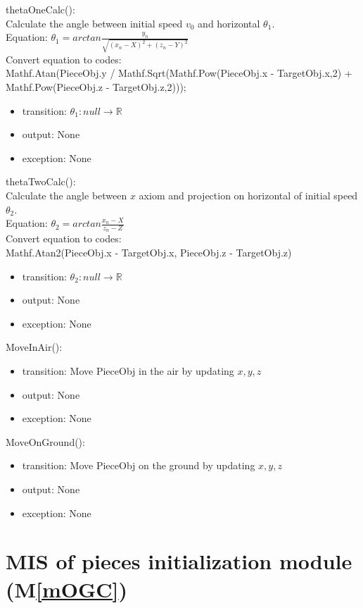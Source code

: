 \documentclass[12pt, titlepage]{article}
\newcommand{\mref}[1]{M\ref{#1}}
\begin{document}
\noindent thetaOneCalc():\\
Calculate the angle between initial speed $v_{0}$ and horizontal $\theta_{1}$. \\
Equation: $\theta_{1}=arctan \frac{y_{n}}{\sqrt{(x_{n}-X)^2+(z_{n}-Y)^2}}$\\
Convert equation to codes:\\
Mathf.Atan(PieceObj.y / Mathf.Sqrt(Mathf.Pow(PieceObj.x - TargetObj.x,2) + Mathf.Pow(PieceObj.z - TargetObj.z,2)));
\begin{itemize}
	\item transition: $\theta_{1}: null \to \mathbb{R}$   
	\item output: None
	\item exception: None
\end{itemize}

\noindent thetaTwoCalc():\\
Calculate the angle between $x$ axiom and projection on horizontal of initial speed $\theta_{2}$.\\
Equation: $\theta_{2}=arctan \frac{x_{n}-X}{z_{n}-Z}$\\
Convert equation to codes:\\
Mathf.Atan2(PieceObj.x - TargetObj.x, PieceObj.z - TargetObj.z)
\begin{itemize}
	\item transition: $\theta_{2}: null \to \mathbb{R}$  
	\item output: None
	\item exception: None
\end{itemize}

\noindent MoveInAir(): \an{use \mref{mDC1} here}
\begin{itemize}
	\item transition: Move PieceObj in the air by updating $x,y,z$
	\item output: None
	\item exception: None
\end{itemize}

\noindent MoveOnGround(): \an{use \mref{mDC1} here}
\begin{itemize}
	\item transition: Move PieceObj on the ground by updating $x,y,z$
	\item output: None
	\item exception: None
\end{itemize}

\section{MIS of pieces initialization module (\mref{mOGC})} 
\end{document}
